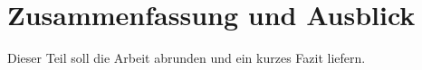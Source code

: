 \section{Zusammenfassung und Ausblick}
\label{sec:kapitel3}




Dieser Teil soll die Arbeit abrunden und ein kurzes Fazit liefern.